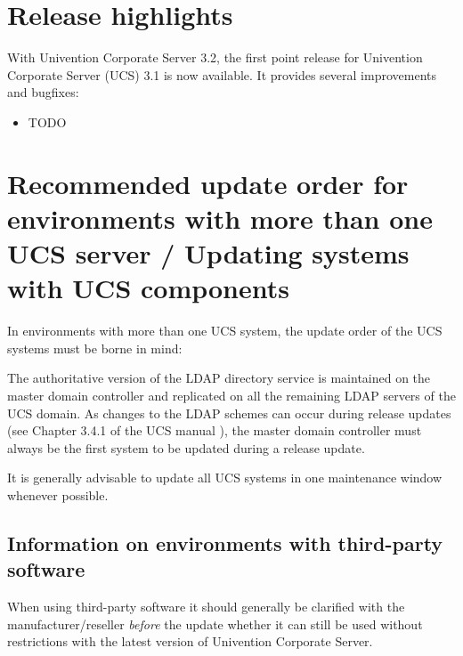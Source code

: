 


\newcommand{\ucsTechAuthor}{ & Univention GmbH & feedback@univention.de}

\setcounter{secnumdepth}{3}
\setcounter{tocdepth}{3}



\chapter{Release highlights}

With Univention Corporate Server 3.2, the first point release for
Univention Corporate Server (UCS) 3.1 is now available. It provides
several improvements and bugfixes:

\begin{itemize}
\item TODO %
\end{itemize}

\chapter{Recommended update order for environments with more than one UCS server / Updating systems with UCS components}

In environments with more than one UCS system, the update order of the
UCS systems must be borne in mind:

The authoritative version of the LDAP directory service
is maintained on the master domain controller and replicated on all the remaining
LDAP servers of the UCS domain. As changes to the LDAP schemes can
occur during release updates (see Chapter 3.4.1 of the UCS
manual \cite{UCS-Handbuch}), the master domain controller must always be the first
system to be updated during a release update.

It is generally advisable to update all UCS systems in one maintenance
window whenever possible. 

\section{Information on environments with third-party software}

When using third-party software it should generally be clarified with
the manufacturer/reseller \emph{before} the update whether it can still
be used without restrictions with the latest version of Univention
Corporate Server. 

